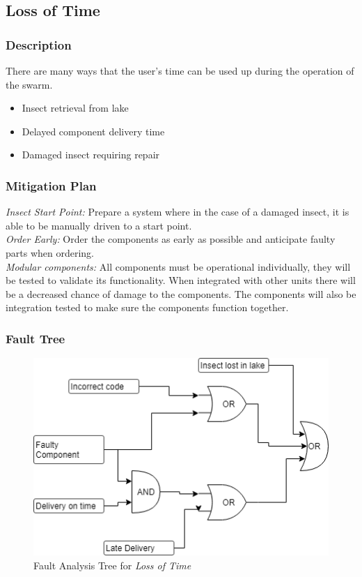 \documentclass[11pt]{article}
\begin{document}
\subsection{Loss of Time}
\subsubsection*{Description}
There are many ways that the user's time can be used up during the operation of the swarm. 
\begin{itemize}
\item Insect retrieval from lake
\item Delayed component delivery time
\item Damaged insect requiring repair
\end{itemize}

\subsubsection*{Mitigation Plan}
\textit{Insect Start Point:} Prepare a system where in the case of a damaged insect, it is able to be manually driven to a start point. \\
\textit{Order Early:} Order the components as early as possible and anticipate faulty parts when ordering. \\
\textit{Modular components:} All components must be operational individually, they will be tested to validate its functionality. When integrated with other units there will be a decreased chance of damage to the components. The components will also be integration tested to make sure the components function together. \\

\subsubsection*{Fault Tree}
\begin{figure}[H]
   \centering
   \includegraphics[width=1\textwidth]{Diagrams/Fault Tree - Time Loss.png}
   \caption{Fault Analysis Tree for \textit{Loss of Time}}
   \label{fig:ft-Time}
\end{figure}
\end{document}
